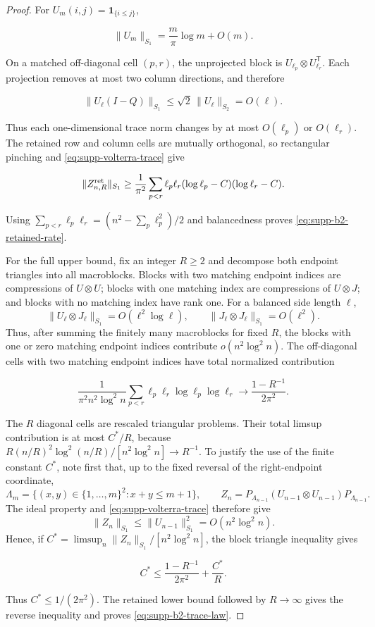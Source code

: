 \begin{proof}
For \(U_m(i,j)=\mathbf1_{\{i\le j\}}\),

\begin{equation}\label{eq:supp-volterra-trace}
 \|U_m\|_{S_1}=\frac m\pi\log m+O(m).
\end{equation}

On a matched off-diagonal cell \((p,r)\), the unprojected block is
\(U_{\ell_p}\otimes U_{\ell_r}^{\mathsf T}\).  Each projection removes at
most two column directions, and therefore

\[
 \|U_\ell(I-Q)\|_{S_1}
 \le\sqrt2\,\|U_\ell\|_{S_2}=O(\ell).
\]

Thus each one-dimensional trace norm changes by at most \(O(\ell_p)\) or
\(O(\ell_r)\).  The retained row and column cells are mutually orthogonal,
so rectangular pinching and \eqref{eq:supp-volterra-trace} give

\[
 \|Z_{n,R}^{\rm ret}\|_{S_1}
 \ge\frac1{\pi^2}\sum_{p<r}\ell_p\ell_r
 (\log\ell_p-C)(\log\ell_r-C).
\]

Using
\(\sum_{p<r}\ell_p\ell_r=(n^2-\sum_p\ell_p^2)/2\) and balancedness proves
\eqref{eq:supp-b2-retained-rate}.

For the full upper bound, fix an integer \(R\ge2\) and decompose both endpoint triangles
into all macroblocks.  Blocks with two matching endpoint indices are
compressions of \(U\otimes U\); blocks with one matching index are
compressions of \(U\otimes J\); and blocks with no matching index have rank
one.  For a balanced side length \(\ell\),
\[
 \|U_\ell\otimes J_\ell\|_{S_1}
 =O(\ell^2\log\ell),
 \qquad
 \|J_\ell\otimes J_\ell\|_{S_1}=O(\ell^2).
\]
Thus, after summing the finitely many macroblocks for fixed \(R\), the blocks
with one or zero matching endpoint indices contribute
\(o(n^2\log^2n)\).  The off-diagonal cells with two matching endpoint indices
have total normalized contribution

\[
 \frac1{\pi^2n^2\log^2n}
 \sum_{p<r}\ell_p\ell_r\log\ell_p\log\ell_r
 \longrightarrow\frac{1-R^{-1}}{2\pi^2}.
\]

The \(R\) diagonal cells are rescaled triangular problems.  Their total
limsup contribution is at most \(C^*/R\), because
\(R(n/R)^2\log^2(n/R)/[n^2\log^2n]\to R^{-1}\).  To justify the use of the
finite constant \(C^*\), note first that, up to the fixed reversal of the
right-endpoint coordinate,
\[
 \Lambda_m=\{(x,y)\in\{1,\ldots,m\}^2:x+y\le m+1\},
 \qquad
 Z_n=P_{\Lambda_{n-1}}
 (U_{n-1}\otimes U_{n-1})P_{\Lambda_{n-1}}.
\]
The ideal property and \eqref{eq:supp-volterra-trace} therefore give
\[
 \|Z_n\|_{S_1}
 \le\|U_{n-1}\|_{S_1}^2
 =O(n^2\log^2n).
\]
Hence, if
\(C^*=\limsup_n\|Z_n\|_{S_1}/[n^2\log^2n]\), the block triangle inequality
gives

\[
 C^*\le\frac{1-R^{-1}}{2\pi^2}+\frac{C^*}{R}.
\]

Thus \(C^*\le1/(2\pi^2)\).  The retained lower bound followed by
\(R\to\infty\) gives the reverse inequality and proves
\eqref{eq:supp-b2-trace-law}.
\end{proof}

